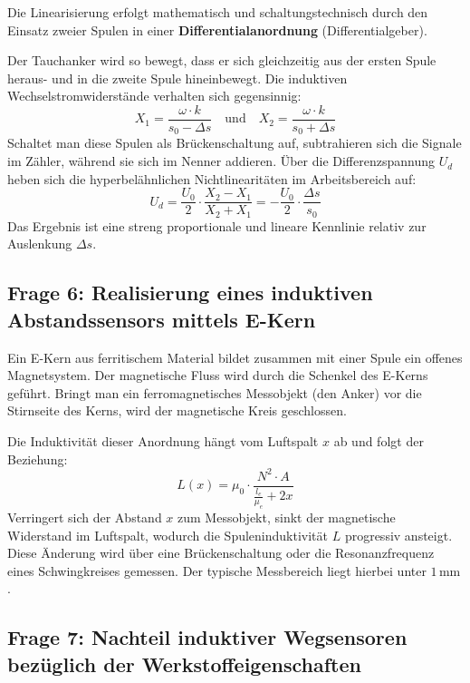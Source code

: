 \documentclass[12pt,a4paper]{article}
\begin{document}
Die Linearisierung erfolgt mathematisch und schaltungstechnisch durch den Einsatz zweier Spulen in einer \textbf{Differentialanordnung} (Differentialgeber). 

Der Tauchanker wird so bewegt, dass er sich gleichzeitig aus der ersten Spule heraus- und in die zweite Spule hineinbewegt. Die induktiven Wechselstromwiderstände verhalten sich gegensinnig:
\begin{equation}
    X_1 = \frac{\omega \cdot k}{s_0 - \Delta s} \quad \text{und} \quad X_2 = \frac{\omega \cdot k}{s_0 + \Delta s}
\end{equation}
Schaltet man diese Spulen als Brückenschaltung auf, subtrahieren sich die Signale im Zähler, während sie sich im Nenner addieren. Über die Differenzspannung $U_d$ heben sich die hyperbelähnlichen Nichtlinearitäten im Arbeitsbereich auf:
\begin{equation}
    U_d = \frac{U_0}{2} \cdot \frac{X_2 - X_1}{X_2 + X_1} = -\frac{U_0}{2} \cdot \frac{\Delta s}{s_0}
\end{equation}
Das Ergebnis ist eine streng proportionale und lineare Kennlinie relativ zur Auslenkung $\Delta s$.

\subsection*{Frage 6: Realisierung eines induktiven Abstandssensors mittels E-Kern}

Ein E-Kern aus ferritischem Material bildet zusammen mit einer Spule ein offenes Magnetsystem. Der magnetische Fluss wird durch die Schenkel des E-Kerns geführt. Bringt man ein ferromagnetisches Messobjekt (den Anker) vor die Stirnseite des Kerns, wird der magnetische Kreis geschlossen. 

Die Induktivität dieser Anordnung hängt vom Luftspalt $x$ ab und folgt der Beziehung:
\begin{equation}
    L(x) = \mu_0 \cdot \frac{N^2 \cdot A}{\frac{l_e}{\mu_e} + 2x}
\end{equation}
Verringert sich der Abstand $x$ zum Messobjekt, sinkt der magnetische Widerstand im Luftspalt, wodurch die Spuleninduktivität $L$ progressiv ansteigt. Diese Änderung wird über eine Brückenschaltung oder die Resonanzfrequenz eines Schwingkreises gemessen. Der typische Messbereich liegt hierbei unter $1\,\text{mm}$.

\subsection*{Frage 7: Nachteil induktiver Wegsensoren bezüglich der Werkstoffeigenschaften}
\end{document}

